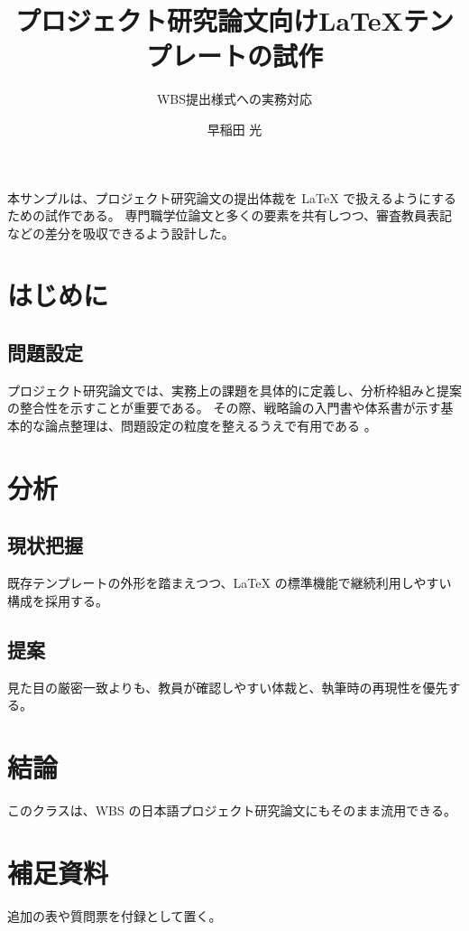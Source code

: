 \documentclass[project-ja]{wbsmba}
\title{プロジェクト研究論文向けLaTeXテンプレートの試作}
\subtitle{WBS提出様式への実務対応}
\author{早稲田 光}
\begin{document}
\maketitle

\begin{abstractpage}
本サンプルは、プロジェクト研究論文の提出体裁を LaTeX で扱えるようにするための試作である。
専門職学位論文と多くの要素を共有しつつ、審査教員表記などの差分を吸収できるよう設計した。
\end{abstractpage}

\wbsfrontmatter
\tableofcontents
\wbsmainmatter

\chapter{はじめに}
\section{問題設定}
プロジェクト研究論文では、実務上の課題を具体的に定義し、分析枠組みと提案の整合性を示すことが重要である。
その際、戦略論の入門書や体系書が示す基本的な論点整理は、問題設定の粒度を整えるうえで有用である
\cite{asaba2010tsukamu,ishii1996strategy}。

\chapter{分析}
\section{現状把握}
既存テンプレートの外形を踏まえつつ、LaTeX の標準機能で継続利用しやすい構成を採用する。

\section{提案}
見た目の厳密一致よりも、教員が確認しやすい体裁と、執筆時の再現性を優先する。

\chapter{結論}
このクラスは、WBS の日本語プロジェクト研究論文にもそのまま流用できる。




\appendix
\chapter{補足資料}
追加の表や質問票を付録として置く。
\end{document}
